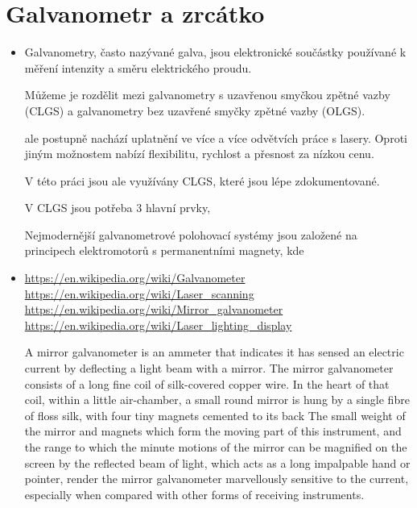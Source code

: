 \documentclass{template/socthesis}
\begin{document}
\section{Galvanometr a zrcátko}
\begin{itemize}
  \item
        Galvanometry, často nazývané galva, jsou elektronické součástky používané k měření intenzity a směru elektrického proudu. \cite{galvo}

        Můžeme je rozdělit mezi galvanometry s uzavřenou smyčkou zpětné vazby (CLGS) a galvanometry bez uzavřené smyčky zpětné vazby (OLGS). \cite{how-ls-work}

        \cite{advanced-galvo}
        ale postupně nachází uplatnění ve více a více odvětvích práce s lasery.
        Oproti jiným možnostem nabízí flexibilitu, rychlost a přesnost za nízkou cenu.


        V této práci jsou ale využívány CLGS, které jsou lépe zdokumentované.

        V CLGS jsou potřeba 3 hlavní prvky, %

        Nejmodernější galvanometrové polohovací systémy jsou založené na principech elektromotorů s permanentními magnety, kde
        \cite{advanced-galvo}
  \item
        \url{https://en.wikipedia.org/wiki/Galvanometer}\\
        \url{https://en.wikipedia.org/wiki/Laser_scanning}\\
        \url{https://en.wikipedia.org/wiki/Mirror_galvanometer}\\
        \url{https://en.wikipedia.org/wiki/Laser_lighting_display}

        A mirror galvanometer is an ammeter that indicates it has sensed an electric current by deflecting a light beam with a mirror.
        The mirror galvanometer consists of a long fine coil of silk-covered copper wire. %
        In the heart of that coil, within a little air-chamber, a small round mirror is hung by a single fibre of floss silk, with four tiny magnets cemented to its back
        The small weight of the mirror and magnets which form the moving part of this instrument, and the range to which the minute motions of the mirror can be magnified on the screen by the reflected beam of light, which acts as a long impalpable hand or pointer, render the mirror galvanometer marvellously sensitive to the current, especially when compared with other forms of receiving instruments.


\end{itemize}
\end{document}
